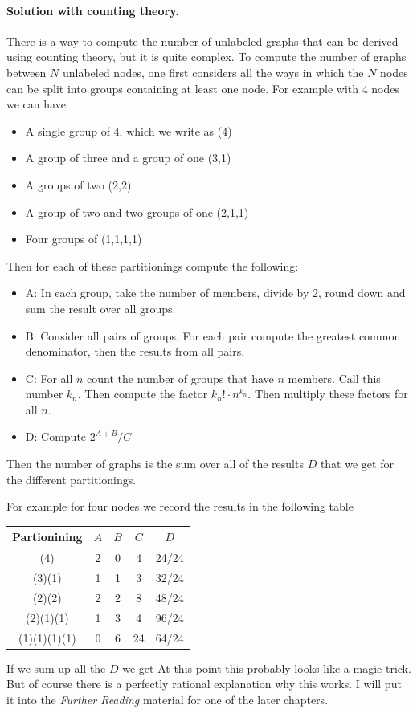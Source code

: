 \paragraph{Solution with counting theory.} There is a way to compute the number of unlabeled graphs that can be derived using counting theory, but it is quite complex. To compute the number of graphs between $N$ unlabeled nodes, one first considers all the ways in which the $N$ nodes can be split into groups containing at least one node. For example with 4 nodes we can have:
\begin{itemize}
\item A single group of 4, which we write as (4)
\item A group of three and a group of one (3,1)
\item A groups of two (2,2) 
\item A group of two and two groups of one (2,1,1)
\item Four groups of (1,1,1,1)
\end{itemize}
Then for each of these partitionings compute the following:
\begin{itemize}
\item A: In each group, take the number of members, divide by 2, round down and sum the result over all groups.
\item B: Consider all pairs of groups. For each pair compute the greatest common denominator, then the results from all pairs.
\item C: For all $n$ count the number of groups that have $n$ members. Call this number $k_n$. Then compute the factor $k_n!\cdot n^{k_n}$. Then multiply these factors for all $n$.
\item D: Compute $2^{A+B}/C$  
\end{itemize}
Then the number of graphs is the sum over all of the results $D$ that we get for the different partitionings.   

For example for four nodes we record the results in the following table 
\begin{center}
\begin{tabular}{c | c c c | c}
Partionining & $A$ & $B$ & $C$ & $D$ \\\hline
(4)          & 2   & 0   &  4  & 24/24 \\
(3)(1)       & 1   & 1   &  3  & 32/24 \\
(2)(2)       & 2   & 2   &  8  & 48/24 \\
(2)(1)(1)    & 1   & 3   &  4  & 96/24 \\
(1)(1)(1)(1) & 0   & 6   &  24 & 64/24 \\
\end{tabular}
\end{center}
If we sum up all the $D$ we get
At this point this probably looks like a magic trick. But of course there is a perfectly rational explanation why this works. I will put it into the \emph{Further Reading} material for one of the later chapters. 

